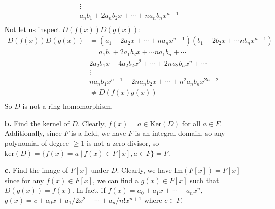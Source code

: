 \documentclass{article}
\begin{document}
\begin{itemize}
\begin{align*}
        & \vdots \\
        &a_nb_1 + 2a_nb_2x + \cdots + na_nb_nx^{n-1} \\
    \end{align*}
    Not let us inspect $D(f(x))D(g(x))$:
    \begin{align*}
        D(f(x))D(g(x)) &= (a_1 + 2a_2x + \cdots + na_nx^{n-1})(b_1 + 2b_2x + \cdots nb_nx^{n-1}) \\
        &= a_1b_1 + 2a_1b_2x + \cdots na_1b_n + \cdots \\
        & 2a_2b_1x + 4a_2b_2x^2 + \cdots + 2na_2b_nx^n + \cdots\\
        & \vdots \\
        & na_nb_1x^{n-1} + 2na_nb_2x + \cdots + n^2a_nb_nx^{2n-2} \\
        &\neq D(f(x)g(x)) \\
    \end{align*}
    So $D$ is not a ring homomorphism.
    \newline
    
    \item[\textbf{b.}] Find the kernel of $D$.
    \newline
    Clearly, $f(x) = a \in \text{Ker}(D)$ for all $a \in F$. Additionally, since $F$ is a field, we have $F$ is an integral domain, so any polynomial of degree $\geq 1$ is not a zero divisor, so $\text{ker}(D) = \{f(x) = a \: | \: f(x) \in F[x], a \in F\} = F$.
    \newline
    
    \item[\textbf{c.}] Find the image of $F[x]$ under $D$.
    \newline
    Clearly, we have $\text{Im}(F[x]) = F[x]$ since for any $f(x) \in F[x]$, we can find a $g(x) \in F[x]$ such that $D(g(x)) = f(x)$. In fact, if $f(x) = a_0 + a_1x + \cdots + a_nx^n$, $g(x) = c + a_0x + a_1/2x^2 + \cdots + a_n/n!x^{n+1}$ where $c \in F$.
    
\end{itemize}
\end{document}
